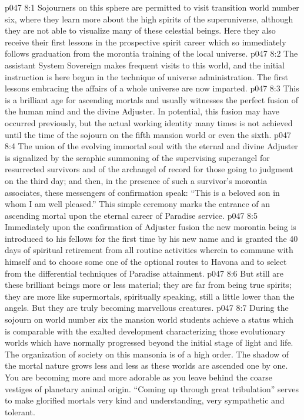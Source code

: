 \vs p047 8:1 Sojourners on this sphere are permitted to visit transition world number six, where they learn more about the high spirits of the superuniverse, although they are not able to visualize many of these celestial beings. Here they also receive their first lessons in the prospective spirit career which so immediately follows graduation from the morontia training of the local universe.
\vs p047 8:2 The assistant System Sovereign makes frequent visits to this world, and the initial instruction is here begun in the technique of universe administration. The first lessons embracing the affairs of a whole universe are now imparted.
\vs p047 8:3 \pc This is a brilliant age for ascending mortals and usually witnesses the perfect fusion of the human mind and the divine Adjuster. In potential, this fusion may have occurred previously, but the actual working identity many times is not achieved until the time of the sojourn on the fifth mansion world or even the sixth.
\vs p047 8:4 \pc The union of the evolving immortal soul with the eternal and divine Adjuster is signalized by the seraphic summoning of the supervising superangel for resurrected survivors and of the archangel of record for those going to judgment on the third day; and then, in the presence of such a survivor’s morontia associates, these messengers of confirmation speak: “This is a beloved son in whom I am well pleased.” This simple ceremony marks the entrance of an ascending mortal upon the eternal career of Paradise service.
\vs p047 8:5 Immediately upon the confirmation of Adjuster fusion the new morontia being is introduced to his fellows for the first time by his new name and is granted the 40 days of spiritual retirement from all routine activities wherein to commune with himself and to choose some one of the optional routes to Havona and to select from the differential techniques of Paradise attainment.
\vs p047 8:6 \pc But still are these brilliant beings more or less material; they are far from being true spirits; they are more like supermortals, spiritually speaking, still a little lower than the angels. But they are truly becoming marvellous creatures.
\vs p047 8:7 During the sojourn on world number six the mansion world students achieve a status which is comparable with the exalted development characterizing those evolutionary worlds which have normally progressed beyond the initial stage of light and life. The organization of society on this mansonia is of a high order. The shadow of the mortal nature grows less and less as these worlds are ascended one by one. You are becoming more and more adorable as you leave behind the coarse vestiges of planetary animal origin. “Coming up through great tribulation” serves to make glorified mortals very kind and understanding, very sympathetic and tolerant.

